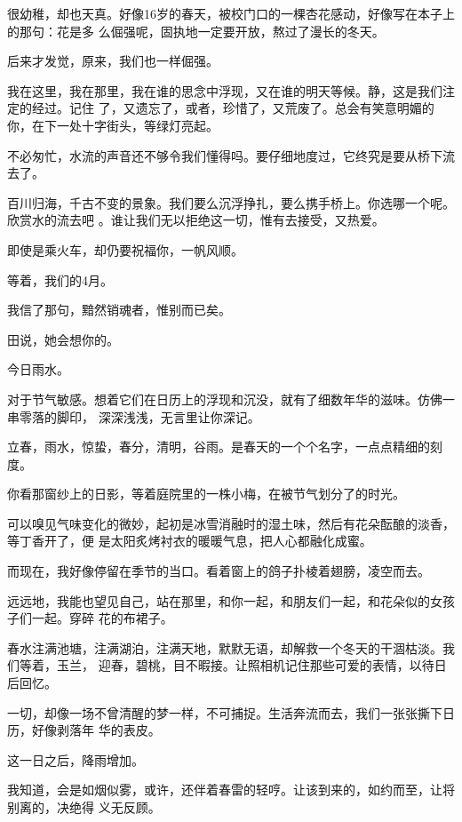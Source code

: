 \documentclass[12pt,a4paper]{article}
\begin{document}
		很幼稚，却也天真。好像16岁的春天，被校门口的一棵杏花感动，好像写在本子上的那句：花是多
	么倔强呢，固执地一定要开放，熬过了漫长的冬天。

		后来才发觉，原来，我们也一样倔强。

		我在这里，我在那里，我在谁的思念中浮现，又在谁的明天等候。静，这是我们注定的经过。记住
	了，又遗忘了，或者，珍惜了，又荒废了。总会有笑意明媚的你，在下一处十字街头，等绿灯亮起。

		不必匆忙，水流的声音还不够令我们懂得吗。要仔细地度过，它终究是要从桥下流去了。

		百川归海，千古不变的景象。我们要么沉浮挣扎，要么携手桥上。你选哪一个呢。欣赏水的流去吧
	。谁让我们无以拒绝这一切，惟有去接受，又热爱。

		即使是乘火车，却仍要祝福你，一帆风顺。

		等着，我们的4月。

		我信了那句，黯然销魂者，惟别而已矣。

		田说，她会想你的。

	\endwriting



		今日雨水。

		对于节气敏感。想着它们在日历上的浮现和沉没，就有了细数年华的滋味。仿佛一串零落的脚印，
	深深浅浅，无言里让你深记。

		立春，雨水，惊蛰，春分，清明，谷雨。是春天的一个个名字，一点点精细的刻度。

		你看那窗纱上的日影，等着庭院里的一株小梅，在被节气划分了的时光。

		可以嗅见气味变化的微妙，起初是冰雪消融时的湿土味，然后有花朵酝酿的淡香，等丁香开了，便
	是太阳炙烤衬衣的暖暖气息，把人心都融化成蜜。

		而现在，我好像停留在季节的当口。看着窗上的鸽子扑棱着翅膀，凌空而去。

		远远地，我能也望见自己，站在那里，和你一起，和朋友们一起，和花朵似的女孩子们一起。穿碎
	花的布裙子。

		春水注满池塘，注满湖泊，注满天地，默默无语，却解救一个冬天的干涸枯淡。我们等着，玉兰，
	迎春，碧桃，目不暇接。让照相机记住那些可爱的表情，以待日后回忆。

		一切，却像一场不曾清醒的梦一样，不可捕捉。生活奔流而去，我们一张张撕下日历，好像剥落年
	华的表皮。

		这一日之后，降雨增加。

		我知道，会是如烟似雾，或许，还伴着春雷的轻哼。让该到来的，如约而至，让将别离的，决绝得
	义无反顾。
\end{document}
